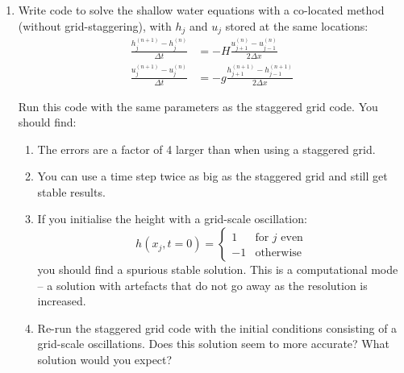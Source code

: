\begin{enumerate}
\begin{enumerate}
\begin{equation}
\ell_{2}=\sqrt{\sum_{j=0}^{n_{x}-1}\frac{\left(h_{j}-h\left(x_{j}\right)\right)^{2}}{\left(h\left(x_{j}\right)\right)^{2}}}
\end{equation}
where $h_{j}$ is the numerical solution and $h\left(x_{j}\right)$
is the analytic solution at $x_{j}$. For this setup, you should get
at $\ell_{2}$ error norm of around 0.04.
\item Double the number of grid points and time steps (so that the Courant
number stays the same). Repeat the simulation, with the solution returning
to the initial conditions. Recalculate the $\ell_{2}$ error norm.
This is a second-order method so $\ell_{2}$ should reduce by a factor
of 4.
\end{enumerate}
\item Write code to solve the shallow water equations with a co-located
method (without grid-staggering), with $h_{j}$ and $u_{j}$ stored
at the same locations:
\begin{align}
\frac{h_{j}^{(n+1)}-h_{j}^{(n)}}{\Delta t} & =-H\frac{u_{j+1}^{(n)}-u_{j-1}^{(n)}}{2\Delta x}\label{eq:linSWh_FB_A}\\
\frac{u_{j}^{(n+1)}-u_{j}^{(n)}}{\Delta t} & =-g\frac{h_{j+1}^{(n+1)}-h_{j-1}^{(n+1)}}{2\Delta x}\label{eq:linSWu_FB_A}
\end{align}

Run this code with the same parameters as the staggered grid code.
You should find:
\begin{enumerate}
\item The errors are a factor of 4 larger than when using a staggered grid.
\item You can use a time step twice as big as the staggered grid and still
get stable results.
\item If you initialise the height with a grid-scale oscillation:
\begin{equation}
h\left(x_{j},t=0\right)=\begin{cases}
1 & \text{for }j\text{ even}\\
-1 & \text{otherwise}
\end{cases}
\end{equation}
you should find a spurious stable solution. This is a computational
mode -- a solution with artefacts that do not go away as the resolution
is increased.
\item Re-run the staggered grid code with the initial conditions consisting
of a grid-scale oscillations. Does this solution seem to more accurate?
What solution would you expect?
\end{enumerate}
\end{enumerate}

